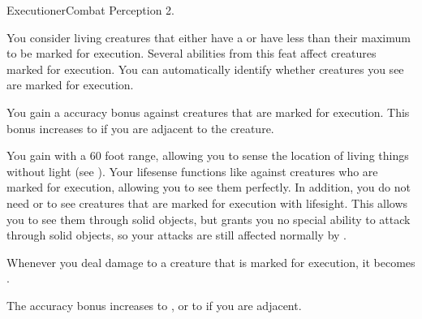   \begin{feat}{Executioner}{Combat}
    \featpres Perception 2.

     You consider living creatures that either have a  or have less than their maximum  to be marked for execution.
    Several abilities from this feat affect creatures marked for execution.
    You can automatically identify whether creatures you see are marked for execution.

     You gain a  accuracy bonus against creatures that are marked for execution.
    This bonus increases to  if you are adjacent to the creature.

     You gain  with a 60 foot range, allowing you to sense the location of living things without light (see ).
    Your lifesense functions like  against creatures who are marked for execution, allowing you to see them perfectly.
    In addition, you do not need  or  to see creatures that are marked for execution with lifesight.
    This allows you to see them through solid objects, but grants you no special ability to attack through solid objects, so your attacks are still affected normally by .

     Whenever you deal damage to a creature that is marked for execution, it  becomes \slowed.

     The accuracy bonus increases to , or to  if you are adjacent.
  \end{feat}

